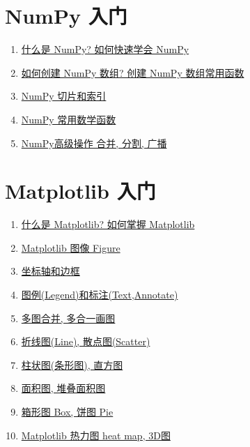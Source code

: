 \documentclass[11pt]{article}
\begin{document}
\vspace{0.5cm}

\section{\kaishu NumPy 入门}

\begin{enumerate}
	\item \href{https://mp.weixin.qq.com/s/0qvt6EzMr_iTRX_mNEotNw}{什么是 NumPy? 如何快速学会 NumPy} %
	\item \href{https://mp.weixin.qq.com/s/QOhIdOidC62iHJSVfYdetQ}{如何创建 NumPy 数组? 创建 NumPy 数组常用函数} %
	\item \href{https://mp.weixin.qq.com/s/v8uxvy-cfbslWgF8RKc5tQ}{NumPy 切片和索引} %
	\item \href{https://mp.weixin.qq.com/s/XrfpD8vis60I-DVrsm9jxQ}{NumPy 常用数学函数} %
	\item \href{https://mp.weixin.qq.com/s/DFRhiB9fLp4PlqQgxLQUIA}{NumPy高级操作 合并, 分割, 广播} %
\end{enumerate}

\newpage 

\section{\kaishu Matplotlib 入门}

\begin{enumerate}
	\item \href{https://mp.weixin.qq.com/s/GKKYKVocf5gEUg62x06ehQ}{什么是 Matplotlib? 如何掌握 Matplotlib} %
	\item \href{https://mp.weixin.qq.com/s/_Nbu-y-Mb9KSSMwgBvfjTg}{Matplotlib 图像 Figure} %
	\item \href{https://mp.weixin.qq.com/s/OnZ2XVptrE8YZK8oJdaoyg}{坐标轴和边框} %
	\item \href{https://mp.weixin.qq.com/s/1nJv3GrG_lZhauE75TTFkQ}{图例(Legend)和标注(Text,Annotate)} %
	\item \href{https://mp.weixin.qq.com/s/A6v7TZbwvGS3utJX5_rxZg}{多图合并, 多合一画图} %
	\item \href{https://mp.weixin.qq.com/s/QBZ9mQG1l80tol3eYFJqDw}{折线图(Line), 散点图(Scatter)} %
	\item \href{https://mp.weixin.qq.com/s/0le4F3mPD_CffH5te4vGoQ}{ 柱状图(条形图), 直方图} %
	\item \href{https://mp.weixin.qq.com/s/53Hk9-q_j-MznVUPajCaqg}{面积图, 堆叠面积图} %
	\item \href{https://mp.weixin.qq.com/s/JmOA9Rrnmiias_5RjsknkQ}{箱形图 Box, 饼图 Pie} %
	\item \href{https://mp.weixin.qq.com/s/efd5acPYcrLXnILJuu5I4Q}{Matplotlib 热力图 heat map, 3D图} %
\end{enumerate}
\end{document}
